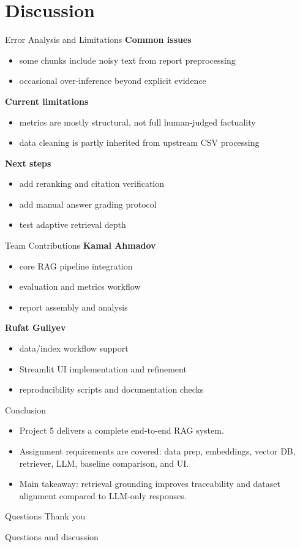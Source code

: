 \documentclass{beamer}
\begin{document}
\section{Discussion}

\begin{frame}{Error Analysis and Limitations}
\small
\textbf{Common issues}
\begin{itemize}
  \item some chunks include noisy text from report preprocessing
  \item occasional over-inference beyond explicit evidence
\end{itemize}

\textbf{Current limitations}
\begin{itemize}
  \item metrics are mostly structural, not full human-judged factuality
  \item data cleaning is partly inherited from upstream CSV processing
\end{itemize}

\textbf{Next steps}
\begin{itemize}
  \item add reranking and citation verification
  \item add manual answer grading protocol
  \item test adaptive retrieval depth
\end{itemize}
\end{frame}

\begin{frame}{Team Contributions}
\small
\textbf{Kamal Ahmadov}
\begin{itemize}
  \item core RAG pipeline integration
  \item evaluation and metrics workflow
  \item report assembly and analysis
\end{itemize}

\textbf{Rufat Guliyev}
\begin{itemize}
  \item data/index workflow support
  \item Streamlit UI implementation and refinement
  \item reproducibility scripts and documentation checks
\end{itemize}
\end{frame}

\begin{frame}{Conclusion}
\small
\begin{itemize}
  \item Project 5 delivers a complete end-to-end RAG system.
  \item Assignment requirements are covered: data prep, embeddings, vector DB, retriever, LLM, baseline comparison, and UI.
  \item Main takeaway: retrieval grounding improves traceability and dataset alignment compared to LLM-only responses.
\end{itemize}
\end{frame}

\begin{frame}{Questions}
\centering
\Large Thank you

\vspace{0.8em}
\normalsize Questions and discussion
\end{frame}
\end{document}
